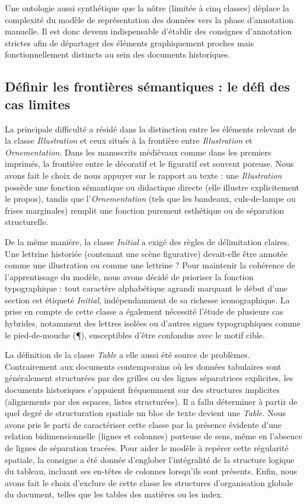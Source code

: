 Une ontologie aussi synthétique que la nôtre (limitée à cinq classes) déplace la complexité du modèle de représentation des données vers la phase d'annotation manuelle. Il est donc devenu indispensable d'établir des consignes d'annotation strictes afin de départager des éléments graphiquement proches mais fonctionnellement distincts au sein des documents historiques.

\subsection{Définir les frontières sémantiques : le défi des cas limites}

La principale difficulté a résidé dans la distinction entre les éléments relevant de la classe \textit{Illustration} et ceux situés à la frontière entre \textit{Illustration} et \textit{Ornementation}. Dans les manuscrits médiévaux comme dans les premiers imprimés, la frontière entre le décoratif et le figuratif est souvent poreuse. Nous avons fait le choix de nous appuyer sur le rapport au texte : une \textit{Illustration} possède une fonction sémantique ou didactique directe (elle illustre explicitement le propos), tandis que l'\textit{Ornementation} (tels que les bandeaux, culs-de-lampe ou frises marginales) remplit une fonction purement esthétique ou de séparation structurelle.

De la même manière, la classe \textit{Initial} a exigé des règles de délimitation claires. Une lettrine historiée (contenant une scène figurative) devait-elle être annotée comme une illustration ou comme une lettrine ? Pour maintenir la cohérence de l'apprentissage du modèle, nous avons décidé de prioriser la fonction typographique : tout caractère alphabétique agrandi marquant le début d'une section est étiqueté \textit{Initial}, indépendamment de sa richesse iconographique. La prise en compte de cette classe a également nécessité l'étude de plusieurs cas hybrides, notamment des lettres isolées ou d'autres signes typographiques comme le pied-de-mouche (¶), susceptibles d'être confondus avec le motif cible.

La définition de la classe \textit{Table} a elle aussi été source de problèmes. Contrairement aux documents contemporains où les données tabulaires sont généralement structurées par des grilles ou des lignes séparatrices explicites, les documents historiques s'appuient fréquemment sur des structures implicites (alignements par des espaces, listes structurées). Il a fallu déterminer à partir de quel degré de structuration spatiale un bloc de texte devient une \textit{Table}. Nous avons pris le parti de caractériser cette classe par la présence évidente d'une relation bidimensionnelle (lignes et colonnes) porteuse de sens, même en l'absence de lignes de séparation tracées. Pour aider le modèle à repérer cette régularité spatiale, la consigne a été donnée d'englober l'intégralité de la structure logique du tableau, incluant ses en-têtes de colonnes lorsqu'ils sont présents. Enfin, nous avons fait le choix d'exclure de cette classe les structures d'organisation globale du document, telles que les tables des matières ou les index.

